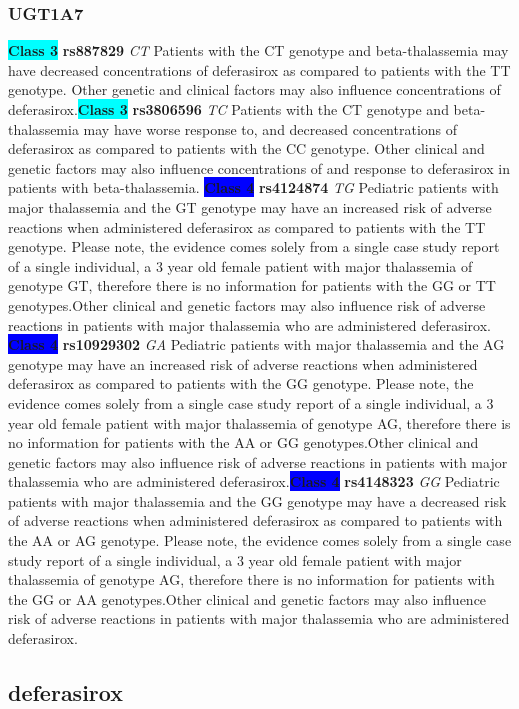 \documentclass{book}
\begin{document}
\subsubsection{ UGT1A7 }

\begin{center}
\textbf{\colorbox{cyan} {Class 3}} \textbf{ rs887829 } \textit{ CT }
Patients with the CT genotype and beta-thalassemia may have decreased concentrations of deferasirox as compared to patients with the TT genotype. Other genetic and clinical factors may also influence concentrations of deferasirox.\textbf{\colorbox{cyan} {Class 3}} \textbf{ rs3806596 } \textit{ TC }
Patients with the CT genotype and beta-thalassemia may have worse response to, and decreased concentrations of deferasirox as compared to patients with the CC genotype. Other clinical and genetic factors may also influence concentrations of and response to deferasirox in patients with beta-thalassemia.
\textbf{\colorbox{blue} {Class 4}} \textbf{ rs4124874 } \textit{ TG }
Pediatric patients with major thalassemia and the GT genotype may have an increased risk of adverse reactions when administered deferasirox as compared to patients with the TT genotype. Please note, the evidence comes solely from a single case study report of a single individual, a 3 year old female patient with major thalassemia of genotype GT, therefore there is no information for patients with the GG or TT genotypes.Other clinical and genetic factors may also influence risk of adverse reactions in patients with major thalassemia who are administered deferasirox. \textbf{\colorbox{blue} {Class 4}} \textbf{ rs10929302 } \textit{ GA }
Pediatric patients with major thalassemia and the AG genotype may have an increased risk of adverse reactions when administered deferasirox as compared to patients with the GG genotype. Please note, the evidence comes solely from a single case study report of a single individual, a 3 year old female patient with major thalassemia of genotype AG, therefore there is no information for patients with the AA or GG genotypes.Other clinical and genetic factors may also influence risk of adverse reactions in patients with major thalassemia who are administered deferasirox.\textbf{\colorbox{blue} {Class 4}} \textbf{ rs4148323 } \textit{ GG }
Pediatric patients with major thalassemia and the GG genotype may have a decreased risk of adverse reactions when administered deferasirox as compared to patients with the AA or AG genotype. Please note, the evidence comes solely from a single case study report of a single individual, a 3 year old female patient with major thalassemia of genotype AG, therefore there is no information for patients with the GG or AA genotypes.Other clinical and genetic factors may also influence risk of adverse reactions in patients with major thalassemia who are administered deferasirox.

\end{center}\subsection{ deferasirox }
\end{document}
